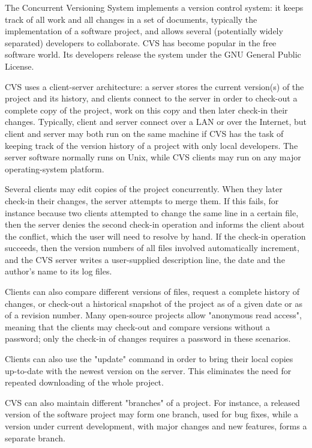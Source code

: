 The Concurrent Versioning System implements a version control system: it keeps track of all work and all
changes in a set of documents, typically the implementation of a software project, and allows several
(potentially widely separated) developers to collaborate. CVS has become popular in the free software
world. Its developers release the system under the GNU General Public License.

CVS uses a client-server architecture: a server stores the current version(s) of the project and its
history, and clients connect to the server in order to check-out a complete copy of the project, work
on this copy and then later check-in their changes. Typically, client and server connect over a LAN
or over the Internet, but client and server may both run on the same machine if CVS has the task of
keeping track of the version history of a project with only local developers. The server software
normally runs on Unix, while CVS clients may run on any major operating-system platform.

Several clients may edit copies of the project concurrently. When they later check-in their changes,
the server attempts to merge them. If this fails, for instance because two clients attempted to change
the same line in a certain file, then the server denies the second check-in operation and informs the
client about the conflict, which the user will need to resolve by hand. If the check-in operation
succeeds, then the version numbers of all files involved automatically increment, and the CVS server
writes a user-supplied description line, the date and the author's name to its log files.

Clients can also compare different versions of files, request a complete history of changes, or
check-out a historical snapshot of the project as of a given date or as of a revision number. Many
open-source projects allow "anonymous read access", meaning that the clients may check-out and compare
versions without a password; only the check-in of changes requires a password in these scenarios.

Clients can also use the "update" command in order to bring their local copies up-to-date with the
newest version on the server. This eliminates the need for repeated downloading of the whole project.

CVS can also maintain different "branches" of a project. For instance, a released version of the
software project may form one branch, used for bug fixes, while a version under current development,
with major changes and new features, forms a separate branch.

